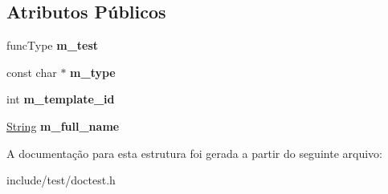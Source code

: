 \subsection*{Atributos Públicos}
\begin{DoxyCompactItemize}
\item 
\mbox{\label{structdoctest_1_1detail_1_1TestCase_aba46691733c89216ce6b0ac0b7dc6b42}} 
func\+Type {\bfseries m\+\_\+test}
\item 
\mbox{\label{structdoctest_1_1detail_1_1TestCase_ad29513e7194ebb6e53e3b1df27ebf48f}} 
const char $\ast$ {\bfseries m\+\_\+type}
\item 
\mbox{\label{structdoctest_1_1detail_1_1TestCase_af5183eb061a33329ede72791ad3457f9}} 
int {\bfseries m\+\_\+template\+\_\+id}
\item 
\mbox{\label{structdoctest_1_1detail_1_1TestCase_a30f21f77461de7bd68dc44362171b62a}} 
\hyperlink{classdoctest_1_1String}{String} {\bfseries m\+\_\+full\+\_\+name}
\end{DoxyCompactItemize}


A documentação para esta estrutura foi gerada a partir do seguinte arquivo\+:\begin{DoxyCompactItemize}
\item 
include/test/doctest.\+h\end{DoxyCompactItemize}
